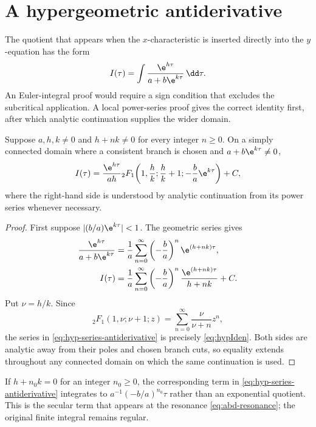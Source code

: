 \appendix

\section{A hypergeometric antiderivative}
\label{app:hyp}

The quotient that appears when the \(x\)-characteristic is inserted directly into
the \(y\)-equation has the form
\begin{equation}
  I(\tau)=\int\frac{\e^{h\tau}}
  {a+b\e^{k\tau}}\,\dd\tau.
  \label{eq:Iform}
\end{equation}
An Euler-integral proof would require a sign condition that excludes the
subcritical application.  A local power-series proof gives the correct identity
first, after which analytic continuation supplies the wider domain.

\begin{proposition}
Suppose \(a,h,k\neq0\) and \(h+nk\neq0\) for every integer \(n\geq0\).  On a
simply connected domain where a consistent branch is chosen and
\(a+b\e^{k\tau}\neq0\),
\begin{equation}
  I(\tau)=
  \frac{\e^{h\tau}}{ah}
  {}_2F_1\!\left(
    1,\frac{h}{k};\frac{h}{k}+1;
    -\frac{b}{a}\e^{k\tau}
  \right)+C,
  \label{eq:hypIden}
\end{equation}
where the right-hand side is understood by analytic continuation from its power
series whenever necessary.
\end{proposition}

\begin{proof}
First suppose
\(\lvert(b/a)\e^{k\tau}\rvert<1\).  The geometric series gives
\begin{align}
  \frac{\e^{h\tau}}{a+b\e^{k\tau}}
  &=\frac1a\sum_{n=0}^{\infty}
    \left(-\frac ba\right)^n\e^{(h+nk)\tau},\\
  I(\tau)
  &=\frac1a\sum_{n=0}^{\infty}
    \left(-\frac ba\right)^n
    \frac{\e^{(h+nk)\tau}}{h+nk}+C.
  \label{eq:hyp-series-antiderivative}
\end{align}
Put \(\nu=h/k\).  Since
\[
  {}_2F_1(1,\nu;\nu+1;z)
  =\sum_{n=0}^{\infty}\frac{\nu}{\nu+n}z^n,
\]
the series in \eqref{eq:hyp-series-antiderivative} is precisely
\eqref{eq:hypIden}.  Both sides are analytic away from their poles and chosen
branch cuts, so equality extends throughout any connected domain on which the
same continuation is used.
\end{proof}

If \(h+n_0k=0\) for an integer \(n_0\geq0\), the corresponding term in
\eqref{eq:hyp-series-antiderivative} integrates to
\(
  a^{-1}(-b/a)^{n_0}\tau
\)
rather than an exponential quotient.  This is the secular term that appears at
the resonance \eqref{eq:abd-resonance}; the original finite integral remains
regular.

